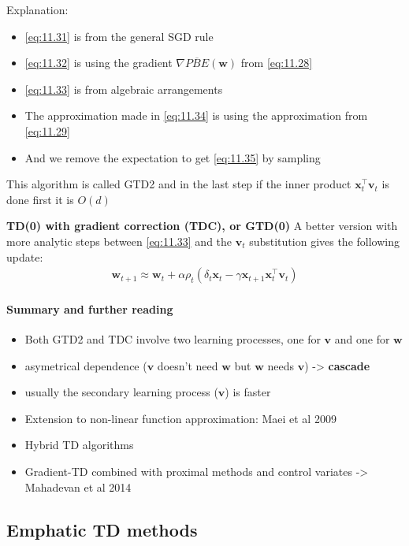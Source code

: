 \documentclass[sutton_barto_notes.tex]{subfiles}
\begin{document}
 Explanation: 
\begin{itemize}
\item \ref{eq:11.31} is from the general SGD rule 
\item \ref{eq:11.32} is using the gradient $\nabla \overline{PBE}(\mathbf{w})$ from \ref{eq:11.28} 
\item \ref{eq:11.33} is from algebraic arrangements 
\item The approximation made in \ref{eq:11.34} is using the approximation from \ref{eq:11.29} 
\item And we remove the expectation to get \ref{eq:11.35} by sampling 
\end{itemize}

 This algorithm is called GTD2 and in the last step if the inner product $\mathbf{x}_t^{\top} \mathbf{v}_t$ is done first it is $O(d)$ 

 \textbf{TD(0) with gradient correction (TDC), or GTD(0)} 
A better version with more analytic steps between \ref{eq:11.33} and the $\mathbf{v}_t$ substitution gives the following update: 
\begin{align}
\mathbf{w}_{t+1} \approx \mathbf{w}_{t} + \alpha \rho_t(\delta_t \mathbf{x}_{t} - \gamma \mathbf{x}_{t+1} \mathbf{x}_{t}^{\top} \mathbf{v}_t) \label{eq:11.36}\tag{11.36}
\end{align}

 \paragraph{Summary and further reading}   
\begin{itemize}
\item Both GTD2 and TDC involve two learning processes, one for $\mathbf{v}$ and one for $\mathbf{w}$ 
\item asymetrical dependence ($\mathbf{v}$ doesn’t need $\mathbf{w}$ but $\mathbf{w}$ needs $\mathbf{v}$) -> \textbf{cascade} 
\item usually the secondary learning process ($\mathbf{v}$) is faster 
\item Extension to non-linear function approximation: Maei et al 2009 
\item Hybrid TD algorithms 
\item Gradient-TD combined with proximal methods and control variates -> Mahadevan et al 2014 
\end{itemize}

\subsection{Emphatic TD methods}
\end{document}
